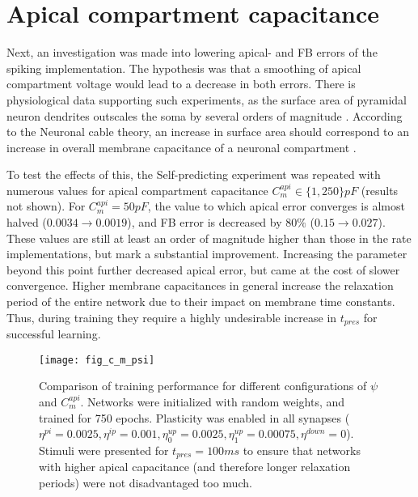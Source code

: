 \section{Apical compartment capacitance}\label{sec-c-m-api}

Next, an investigation was made into lowering apical- and FB errors of the spiking implementation. The hypothesis was
that a smoothing of apical compartment voltage would lead to a decrease in both errors. There is physiological data
supporting such experiments, as the surface area of pyramidal neuron dendrites outscales the soma by several orders of
magnitude \citep{Ishizuka1995}. According to the Neuronal cable theory, an increase in surface area should correspond to
an increase in overall membrane capacitance of a neuronal compartment \citep{Niebur2008}.


To test the effects of this, the Self-predicting experiment was repeated with numerous values for apical compartment
capacitance $C_m^{api} \in \{ 1, 250 \} pF$ (results not shown). For $C_m^{api} = 50pF$, the value to which apical error
converges is almost halved ($0.0034 \rightarrow 0.0019$), and FB error is decreased by $80\%$ ($0.15 \rightarrow
0.027$). These values are still at least an order of magnitude higher than those in the rate implementations, but mark a
substantial improvement. Increasing the parameter beyond this point further decreased apical error, but came at the cost
of slower convergence. Higher membrane capacitances in general increase the relaxation period of the entire network due
to their impact on membrane time constants. Thus, during training they require a highly undesirable increase in
$t_{pres}$ for successful learning.

\begin{figure}[h]
    \centering
    \texttt{[image: fig\_c\_m\_psi]}
    \caption[Comparison of training performance for different configurations of $\psi$ and $C_m^{api}$.]{Comparison of
    training performance for different configurations of $\psi$ and $C_m^{api}$. Networks were initialized with random
    weights, and trained for 750 epochs. Plasticity was enabled in all synapses ($\eta^{pi}=0.0025, \eta^{ip}=0.001,
    \eta^{up}_0=0.0025, \eta^{up}_1=0.00075, \eta^{down}=0$). Stimuli were presented for $t_{pres}=100ms$ to ensure that
    networks with higher apical capacitance (and therefore longer relaxation periods) were not disadvantaged too much. }
    \label{fig-c-m-psi}
\end{figure}

